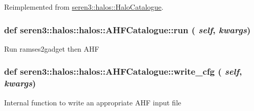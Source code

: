 Reimplemented from \hyperlink{classseren3_1_1halos_1_1HaloCatalogue}{seren3::halos::HaloCatalogue}.\hypertarget{classseren3_1_1halos_1_1halos_1_1AHFCatalogue_a985c910465c63e030ee919df6ab16fcc}{
\subsubsection[{run}]{\setlength{\rightskip}{0pt plus 5cm}def seren3::halos::halos::AHFCatalogue::run ( {\em self}, \/   {\em kwargs})}}
\label{classseren3_1_1halos_1_1halos_1_1AHFCatalogue_a985c910465c63e030ee919df6ab16fcc}
\begin{DoxyVerb}
Run ramses2gadget then AHF
\end{DoxyVerb}
 \hypertarget{classseren3_1_1halos_1_1halos_1_1AHFCatalogue_a8a748791488ca423b94f656d0feaa891}{
\subsubsection[{write\_\-cfg}]{\setlength{\rightskip}{0pt plus 5cm}def seren3::halos::halos::AHFCatalogue::write\_\-cfg ( {\em self}, \/   {\em kwargs})}}
\label{classseren3_1_1halos_1_1halos_1_1AHFCatalogue_a8a748791488ca423b94f656d0feaa891}
\begin{DoxyVerb}
Internal function to write an appropriate AHF input file
\end{DoxyVerb}
 

